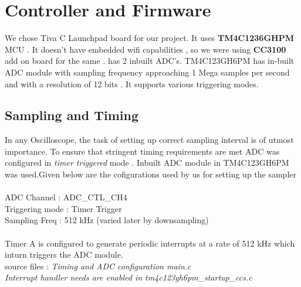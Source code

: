 \documentclass{article}
\begin{document}
	\section{Controller and Firmware }
	We chose Tiva C Launchpad board for our project. It uses \textbf{TM4C1236GHPM} MCU . It doesn't have embedded wifi capabilities , so we were using \textbf{CC3100} add on board for the same .  has 2 inbuilt ADC's. TM4C123GH6PM has in-built ADC module with sampling frequency approaching 1 Mega samples per second and with a resolution of 12 bits . It supports various triggering modes.
	\subsection{Sampling and Timing}
	In any Oscilloscope, the task of  setting up correct sampling interval is of utmost importance. To ensure that stringent timing requirements are met  ADC was configured in \textit{timer triggered} mode .  Inbuilt
	ADC module in TM4C123GH6PM was used.Given below are the cofigurations used by us for setting up the sampler\\\\
	ADC Channel			: ADC\_CTL\_CH4\\
	Triggering mode : Timer Trigger	\\	
	Sampling Freq 	: 512 kHz (varied later by downsampling)\\\\
	Timer A is configured to generate periodic interrupts at a rate of 512 kHz which inturn triggers the ADC 
	module.\\ source files : \textit{Timing  and ADC configuration  main.c}\\ 
	\textit{Interrupt handler needs are enabled in tm4c123gh6pm\_startup\_ccs.c}
\end{document}
